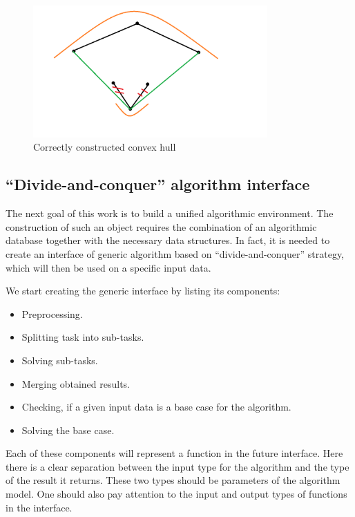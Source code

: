 \documentclass[a4paper,UKenglish,cleveref, autoref]{socg-lipics-v2019}
\begin{document}
	\begin{figure}[t]
		\centering
		\includegraphics[width=0.8\textwidth, height=0.3\textheight]{correct_convex_hull}
		\caption{Correctly constructed convex hull}
		\label{fig:correct_convex_hull}
	\end{figure}



\subsection{``Divide-and-conquer'' algorithm interface}


	The next goal of this work is to build a unified algorithmic environment. The construction of such an object requires the combination of an algorithmic database together with the necessary data structures.  In fact, it is needed to create an interface of generic algorithm based on ``divide-and-conquer'' strategy, which will then be used on a specific input data.
	
	We start creating the generic interface by listing its components:
	
	\begin{itemize}
		\item 
		Preprocessing.
		\item 
		Splitting task into sub-tasks.
		\item 
		Solving sub-tasks.
		\item 
		Merging obtained results.
		\item 
		Checking, if a given input data is a base case for the algorithm.
		\item 
		Solving the base case.
	\end{itemize}
	
	Each of these components will represent a function in the future interface. Here there is a clear separation between the input type for the algorithm and the type of the result it returns. These two types should be parameters of the algorithm model. One should also pay attention to the input and output types of functions  in the interface.
	
\end{document}
